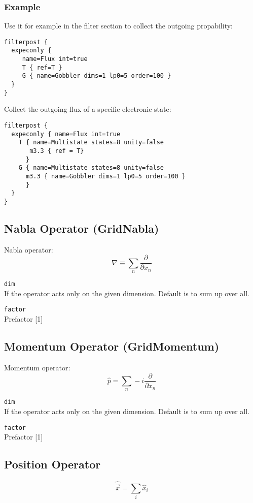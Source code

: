 \documentclass[a4paper,12pt]{scrbook}
\newcommand{\option}[2]{\item \texttt{#1}\\ #2}
\begin{document}
\subsubsection*{Example}
Use it for example in the filter section to collect the outgoing propability:
\begin{verbatim}
filterpost {
  expeconly {
     name=Flux int=true
     T { ref=T }
     G { name=Gobbler dims=1 lp0=5 order=100 }
  }
}
\end{verbatim}
Collect the outgoing flux of a specific electronic state:
\begin{verbatim}
filterpost {
  expeconly { name=Flux int=true
    T { name=Multistate states=8 unity=false
       m3.3 { ref = T}
      }
    G { name=Multistate states=8 unity=false
      m3.3 { name=Gobbler dims=1 lp0=5 order=100 }
      }
  }
}
\end{verbatim}

\subsection{Nabla Operator (GridNabla)}
Nabla operator:
\begin{equation}
 \nabla  \equiv \sum_n \frac{\partial}{\partial x_n}
\end{equation}

\begin{options}
 \option{dim}{If the operator acts only on the given dimension. Default is to sum up over all.}
 \option{factor}{Prefactor [1]}
\end{options}

\subsection{Momentum Operator (GridMomentum)}
Momentum operator:
\begin{equation}
 \hat p = \sum_n -i \frac{\partial}{\partial x_n}
\end{equation}

\begin{options}
 \option{dim}{If the operator acts only on the given dimension. Default is to sum up over all.}
  \option{factor}{Prefactor [1]}
\end{options}

\subsection{Position Operator}
\begin{equation}
 \hat \vec{x} = \sum_i \hat x_i
\end{equation}
\end{document}
